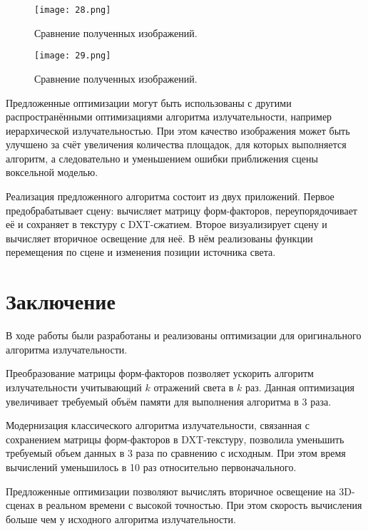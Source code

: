 \documentclass[12pt,fleqn]{article}
\begin{document}
\begin{figure}[htb]
    \centering
    \texttt{[image: 28.png]}
    \caption{Сравнение полученных изображений.}
    \label{image_comparison2}
\end{figure}

\begin{figure}[htb]
    \centering
    \texttt{[image: 29.png]}
    \caption{Сравнение полученных изображений.}
    \label{image_comparison3}
\end{figure}

Предложенные оптимизации могут быть использованы с другими распространёнными оптимизациями алгоритма излучательности, например иерархической излучательностью. При этом качество изображения может быть улучшено за счёт увеличения количества площадок, для которых выполняется алгоритм, а следовательно и уменьшением ошибки приближения сцены воксельной моделью.

Реализация предложенного алгоритма состоит из двух приложений. Первое предобрабатывает сцену: вычисляет матрицу форм-факторов, переупорядочивает её и сохраняет в текстуру с DXT-сжатием. Второе визуализирует сцену и вычисляет вторичное освещение для неё. В нём реализованы функции перемещения по сцене и изменения позиции источника света.

\pagebreak

\section{Заключение}

В ходе работы были разработаны и реализованы оптимизации для оригинального алгоритма излучательности. 

Преобразование матрицы форм-факторов позволяет ускорить алгоритм излучательности учитывающий $k$ отражений света в $k$ раз. Данная оптимизация увеличивает требуемый объём памяти для выполнения алгоритма в 3 раза.

Модернизация классического алгоритма излучательности, связанная с сохранением матрицы форм-факторов в DXT-текстуру, позволила уменьшить требуемый объем данных в 3 раза по сравнению с исходным. При этом время вычислений уменьшилось в 10 раз относительно первоначального.

Предложенные оптимизации позволяют вычислять вторичное освещение на 3D-сценах в реальном времени с высокой точностью. При этом скорость вычисления больше чем у исходного алгоритма излучательности.

\newpage
\renewcommand{\bibname}{Список литературы}
\addcontentsline{toc}{section}{\bibname}





\end{document}

